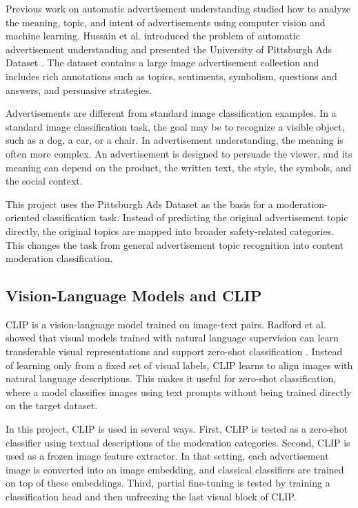 \documentclass[12pt]{article}
\begin{document}
Previous work on automatic advertisement understanding studied how to analyze the meaning, topic, and intent of advertisements using computer vision and machine learning. Hussain et al. introduced the problem of automatic advertisement understanding and presented the University of Pittsburgh Ads Dataset \cite{hussain2017ads}. The dataset contains a large image advertisement collection and includes rich annotations such as topics, sentiments, symbolism, questions and answers, and persuasive strategies.

Advertisements are different from standard image classification examples. In a standard image classification task, the goal may be to recognize a visible object, such as a dog, a car, or a chair. In advertisement understanding, the meaning is often more complex. An advertisement is designed to persuade the viewer, and its meaning can depend on the product, the written text, the style, the symbols, and the social context.

This project uses the Pittsburgh Ads Dataset as the basis for a moderation-oriented classification task. Instead of predicting the original advertisement topic directly, the original topics are mapped into broader safety-related categories. This changes the task from general advertisement topic recognition into content moderation classification.

\subsection{Vision-Language Models and CLIP}

CLIP is a vision-language model trained on image-text pairs. Radford et al. showed that visual models trained with natural language supervision can learn transferable visual representations and support zero-shot classification \cite{radford2021clip}. Instead of learning only from a fixed set of visual labels, CLIP learns to align images with natural language descriptions. This makes it useful for zero-shot classification, where a model classifies images using text prompts without being trained directly on the target dataset.

In this project, CLIP is used in several ways. First, CLIP is tested as a zero-shot classifier using textual descriptions of the moderation categories. Second, CLIP is used as a frozen image feature extractor. In that setting, each advertisement image is converted into an image embedding, and classical classifiers are trained on top of these embeddings. Third, partial fine-tuning is tested by training a classification head and then unfreezing the last visual block of CLIP.
\end{document}

